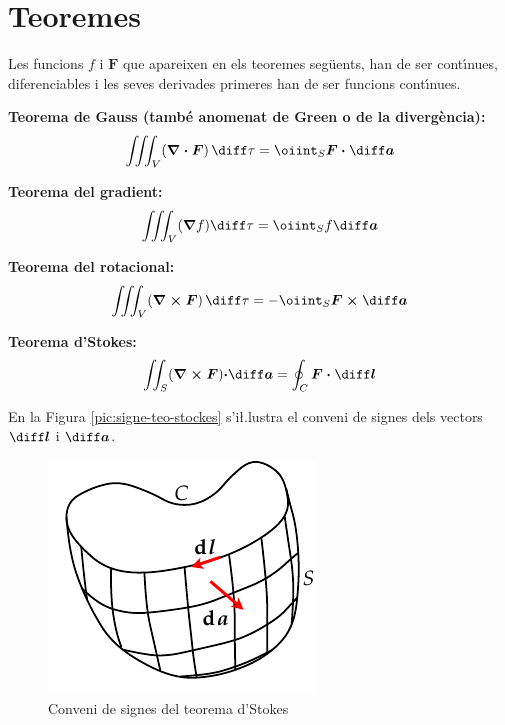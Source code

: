 \documentclass[catalan,a4paper,twoside,11pt]{article}
\begin{document}
\section{Teoremes }

Les funcions $f$ i $\boldsymbol{F}$ que apareixen en els teoremes seg\"{u}ents, han de ser cont\'{\i}nues, diferenciables i les seves derivades primeres han de ser funcions cont\'{\i}nues.

\textbf{Teorema de Gauss (tamb\'{e} anomenat de Green o de la diverg\`{e}ncia):}
\begin{equation}
    \iiint_V(\boldsymbol{\nabla\cdot F})\,\diff \tau = \oiint_S\boldsymbol{F\cdot\diff a}
\end{equation}

\textbf{Teorema del gradient:}
\begin{equation}
    \iiint_V(\boldsymbol{\nabla}f)\diff \tau = \oiint_S f\boldsymbol{\diff a}
\end{equation}

\textbf{Teorema del rotacional:}
\begin{equation}
    \iiint_V(\boldsymbol{\nabla\times F})\,\diff \tau=-\oiint_S
    \boldsymbol{F\times\diff a}
\end{equation}

\textbf{Teorema d'Stokes:}
\begin{equation}
    \iint_S(\boldsymbol{\nabla\times F})\boldsymbol{\cdot\diff a} =
    \oint_C\boldsymbol{F\cdot\diff l}
\end{equation}

En la Figura \vref{pic:signe-teo-stockes} s'i{\l.l}ustra el conveni de
signes dels vectors $\boldsymbol{\diff l}$ i $\boldsymbol{\diff a}$.

\begin{figure}[h]
\centering
     \includegraphics{Imatges/Stokes.pdf}
\caption{Conveni de signes del teorema d'Stokes}
\label{pic:signe-teo-stockes}
\end{figure}
\end{document}
